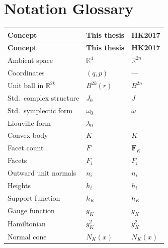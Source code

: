 %
%
\section{Notation Glossary}\label{app:notation}



\begin{longtable}{p{5.3cm} p{3.4cm} p{3.4cm}}
\toprule
\textbf{Concept} & \textbf{This thesis} & \textbf{HK2017} \\
\midrule
\endfirsthead
\midrule
\textbf{Concept} & \textbf{This thesis} & \textbf{HK2017} \\
\midrule
\endhead

Ambient space                                    & $\mathbb{R}^4$      & $\mathbb{R}^{2n}$ \\
Coordinates                                      & $(q,p)$              & --- \\
Unit ball in $\mathbb{R}^{2k}$                   & $B^{2k}(r)$         & $B^{2n}$ \\
Std.\ complex structure                          & $J_0$                & $J$ \\
Std.\ symplectic form                            & $\omega_0$           & $\omega$ \\
Liouville form                                   & $\lambda_0$          & --- \\
Convex body                                      & $K$                  & $K$ \\
Facet count                                      & $F$                  & $\mathbf{F}_K$ \\
Facets                                           & $F_i$                & $F_i$ \\
Outward unit normals                             & $n_i$                & $n_i$ \\
Heights                                          & $h_i$                & $h_i$ \\
Support function                                 & $h_K$                & $h_K$ \\
Gauge function                                   & $g_K$                & $g_K$ \\
Hamiltonian                                      & $g_K^2$              & $g_K^2$ \\
Normal cone                                      & $N_K(x)$             & $N_K(x)$ \\

\end{longtable}

